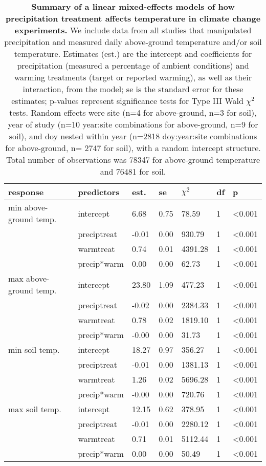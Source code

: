 \documentclass{article}
\begin{document}
\begin{table}[ht]
\centering
\caption{\textbf{Summary of a linear mixed-effects models of how precipitation treatment affects temperature in climate change experiments.} We include data from all studies that manipulated precipitation and measured daily above-ground temperature and/or soil temperature. Estimates (est.) are the intercept and coefficients for precipitation (measured a percentage of ambient conditions) and warming treatments (target or reported warming), as well as their interaction, from the model; se is the standard error for these estimates; p-values represent significance tests for Type III Wald $\chi^{2}$ tests. Random effects were site (n=4 for above-ground, n=3 for soil), year of study (n=10 year:site combinations for above-ground, n=9 for soil), and doy nested within year (n=2818 doy:year:site combinations for above-ground, n= 2747 for soil), with a random intercept structure. Total number of observations was 78347 for above-ground temperature and 76481 for soil.} 
\label{table:preciptemp}
\begingroup\footnotesize
\begin{tabular}{|p{}|p{}|p{}|p{}|p{}|p{}|p{}|}
  \hline
response & predictors & est. & se & $\chi^{2}$ & df & p \\ 
  \hline
min above-ground temp. & intercept & 6.68 & 0.75 & 78.59 & 1 & <0.001 \\ 
   & preciptreat & -0.01 & 0.00 & 930.79 & 1 & <0.001 \\ 
   & warmtreat & 0.74 & 0.01 & 4391.28 & 1 & <0.001 \\ 
   & precip*warm & 0.00 & 0.00 & 62.73 & 1 & <0.001 \\ 
   \hline
max above-ground temp. & intercept & 23.80 & 1.09 & 477.23 & 1 & <0.001 \\ 
   & preciptreat & -0.02 & 0.00 & 2384.33 & 1 & <0.001 \\ 
   & warmtreat & 0.78 & 0.02 & 1819.10 & 1 & <0.001 \\ 
   & precip*warm & -0.00 & 0.00 & 31.73 & 1 & <0.001 \\ 
   \hline
min soil temp. & intercept & 18.27 & 0.97 & 356.27 & 1 & <0.001 \\ 
   & preciptreat & -0.01 & 0.00 & 1381.13 & 1 & <0.001 \\ 
   & warmtreat & 1.26 & 0.02 & 5696.28 & 1 & <0.001 \\ 
   & precip*warm & -0.00 & 0.00 & 720.76 & 1 & <0.001 \\ 
   \hline
max soil temp. & intercept & 12.15 & 0.62 & 378.95 & 1 & <0.001 \\ 
   & preciptreat & -0.01 & 0.00 & 2280.12 & 1 & <0.001 \\ 
   & warmtreat & 0.71 & 0.01 & 5112.44 & 1 & <0.001 \\ 
   & precip*warm & 0.00 & 0.00 & 50.49 & 1 & <0.001 \\ 
   \hline
\end{tabular}
\endgroup
\end{table}  %
\end{document}
